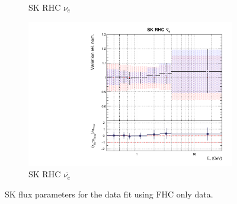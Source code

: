 \begin{figure}[t]
\begin{subfigure}{0.45\textwidth}
  \caption{SK RHC $\nu_{e}$}
\end{subfigure}
\begin{subfigure}{0.45\textwidth}
  \centering
  \includegraphics[width=0.75\linewidth]{figs/rhcmpdat248flux_15}
  \caption{SK RHC $\bar{\nu_e}$}
\end{subfigure}
\caption{SK flux parameters for the data fit using FHC only data.}
\label{fig:rhcmpidat248fluxSK}
\end{figure}

